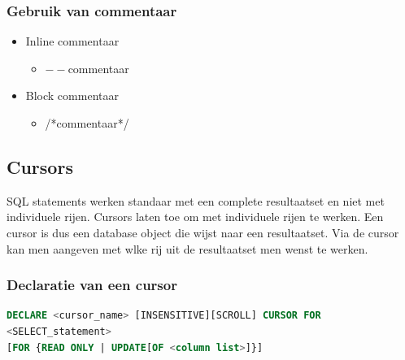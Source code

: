 \documentclass[a4paper,12pt]{article}
\begin{document}
\subsubsection{Gebruik van commentaar}
\begin{itemize}
\item Inline commentaar
	\begin{itemize}
	\item $--$commentaar
	\end{itemize}
\item Block commentaar
	\begin{itemize}
	\item /*commentaar*/
	\end{itemize}
\end{itemize}

\subsection{Cursors}
SQL statements werken standaar met een complete resultaatset en niet met individuele rijen. Cursors laten toe om met individuele rijen te werken.
Een cursor is dus een database object die wijst naar een resultaatset. Via de cursor kan men aangeven met wlke rij uit de resultaatset men wenst te werken.

\subsubsection{Declaratie van een cursor}
\begin{lstlisting}[language=sql, breaklines=true]
DECLARE <cursor_name> [INSENSITIVE][SCROLL] CURSOR FOR
<SELECT_statement>
[FOR {READ ONLY | UPDATE[OF <column list>]}]
\end{lstlisting}
\end{document}
